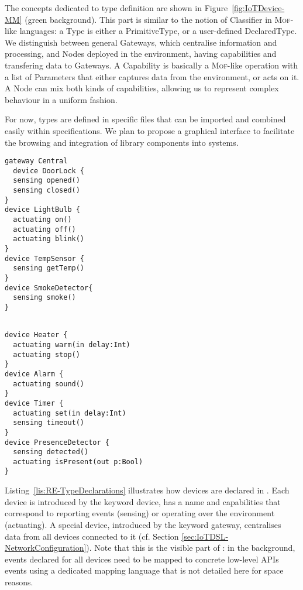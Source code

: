 The concepts dedicated to type definition are shown in Figure~\ref{fig:IoTDevice-MM} (green background). This part is similar to the notion of \textsf{Classifier} in \textsc{Mof}-like languages: a \textsf{Type} is either a \textsf{PrimitiveType}, or a user-defined \textsf{DeclaredType}. We distinguish between general \textsf{Gateway}s, which centralise information and processing, and \textsf{Node}s deployed in the environment, having capabilities and transfering data to \textsf{Gateway}s. A \textsf{Capability} is basically a \textsc{Mof}-like operation with a list of \textsf{Parameter}s that either captures data from the environment, or acts on it. A \textsf{Node} can mix both kinds of capabilities, allowing us to represent complex behaviour in a uniform fashion.

For now, types are defined in specific files that can be imported and combined easily within \IOT specifications. We plan to propose a graphical interface to facilitate the browsing and integration of library components into \IOT systems.

\begin{center}
  \begin{minipage}[t]{.38\linewidth}
    \begin{lstlisting}[language=iotdsl]	
gateway Central
  device DoorLock {
  sensing opened()
  sensing closed()
}
device LightBulb {
  actuating on()
  actuating off()
  actuating blink()
}	
device TempSensor {
  sensing getTemp()
}
device SmokeDetector{
  sensing smoke()
}


    \end{lstlisting}
  \end{minipage}\hfill
  \begin{minipage}[t]{.52\linewidth}
    \begin{lstlisting}[language=iotdsl, firstnumber=17]
device Heater {
  actuating warm(in delay:Int)
  actuating stop()
}
device Alarm {
  actuating sound()
}
device Timer {
  actuating set(in delay:Int)
  sensing timeout()
}
device PresenceDetector {
  sensing detected()
  actuating isPresent(out p:Bool)
}
    \end{lstlisting}
  \end{minipage}
  \label{lis:RE-TypeDeclarations}
\end{center}


Listing~\ref{lis:RE-TypeDeclarations} illustrates how devices are declared in \IOTDSL. Each device is introduced by the keyword \textsf{device}, has a name and capabilities that correspond to reporting events (\textsf{sensing}) or operating over the environment (\textsf{actuating}). A special device, introduced by the keyword \textsf{gateway}, centralises data from all devices connected to it (cf. Section \ref{sec:IoTDSL-NetworkConfiguration}). Note that this is the visible part of \IOTDSL: in the background, events declared for all devices need to be mapped to concrete low-level APIs events using a dedicated mapping language that is not detailed here for space reasons.




